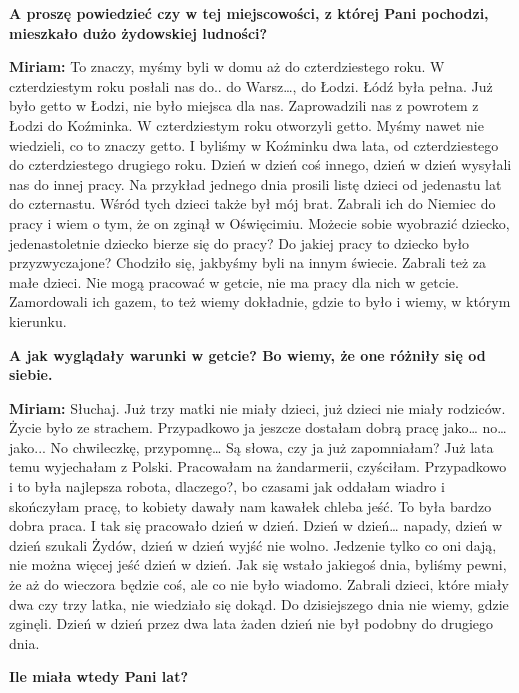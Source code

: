 \textbf{A proszę powiedzieć czy w tej miejscowości, z której Pani pochodzi, mieszkało dużo żydowskiej ludności?}

\textbf{Miriam:} To znaczy, myśmy byli w domu aż do czterdziestego roku. W czterdziestym roku posłali nas do.. do Warsz…, do Łodzi. Łódź była pełna. Już było getto w Łodzi, nie było miejsca dla nas. Zaprowadzili nas z powrotem z Łodzi do Koźminka. W czterdziestym roku otworzyli getto. Myśmy nawet nie wiedzieli, co to znaczy getto. I byliśmy w Koźminku dwa lata, od czterdziestego do czterdziestego drugiego roku. Dzień w dzień coś innego, dzień w dzień wysyłali nas do innej pracy. Na przykład jednego dnia prosili listę dzieci od jedenastu lat do czternastu. Wśród tych dzieci także był mój brat. Zabrali ich do Niemiec do pracy i wiem o tym, że on zginął w Oświęcimiu. Możecie sobie wyobrazić dziecko, jedenastoletnie dziecko bierze się do pracy? Do jakiej pracy to dziecko było przyzwyczajone? Chodziło się, jakbyśmy byli na innym świecie. Zabrali też za małe dzieci. Nie mogą pracować w getcie, nie ma pracy dla nich w getcie. Zamordowali ich gazem, to też wiemy dokładnie, gdzie to było i wiemy, w którym kierunku. 

\textbf{A jak wyglądały warunki w getcie? Bo wiemy, że one różniły się od siebie.} 

\textbf{Miriam:} Słuchaj. Już trzy matki nie miały dzieci, już dzieci nie miały rodziców. Życie było ze strachem. Przypadkowo ja jeszcze dostałam dobrą pracę jako… no… jako... No chwileczkę, przypomnę… Są słowa, czy ja już zapomniałam? Już lata temu wyjechałam z Polski. Pracowałam na żandarmerii, czyściłam. Przypadkowo i to była najlepsza robota, dlaczego?, bo czasami jak oddałam wiadro i skończyłam pracę, to kobiety dawały nam kawałek chleba jeść. To była bardzo dobra praca. I tak się pracowało dzień w dzień. Dzień w dzień… napady, dzień w dzień szukali Żydów, dzień w dzień wyjść nie wolno. Jedzenie tylko co oni dają, nie można więcej jeść dzień w dzień. Jak się wstało jakiegoś dnia, byliśmy pewni, że aż do wieczora będzie coś, ale co nie było wiadomo. Zabrali dzieci, które miały dwa czy trzy latka, nie wiedziało się dokąd. Do dzisiejszego dnia nie wiemy, gdzie zginęli. Dzień w dzień przez dwa lata żaden dzień nie był podobny do drugiego dnia. 

\textbf{Ile miała wtedy Pani lat?} 

